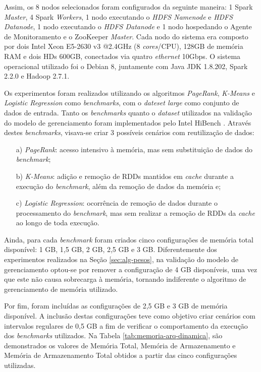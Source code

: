 Assim, os 8 nodos selecionados foram configurados da seguinte maneira: 1 Spark \textit{Master}, 4 Spark \textit{Workers}, 1 nodo executando o \textit{HDFS Namenode} e \textit{HDFS Datanode}, 1 nodo executando o \textit{HDFS Datanode} e 1 nodo hospedando o Agente de Monitoramento e o ZooKeeper \textit{Master}. Cada nodo do sistema era composto por dois  Intel Xeon E5-2630 v3 @2.4GHz (8 \textit{cores}/CPU), 128GB de memória RAM e dois HDs 600GB, conectados via quatro \textit{ethernet} 10Gbps. O sistema operacional utilizado foi o Debian 8, juntamente com Java JDK 1.8.202, Spark 2.2.0 e Hadoop 2.7.1.

Os experimentos foram realizados utilizando os algoritmos \textit{PageRank}, \textit{K-Means} e \textit{Logistic Regression} como \textit{benchmarks}, com o \textit{dateset large} como conjunto de dados de entrada. Tanto os \textit{benchmarks} quanto o \textit{dataset} utilizados na validação do modelo de gerenciamento foram implementados pelo Intel HiBench \cite{huang2010hibench}. Através destes \textit{benchmarks}, visava-se criar 3 possíveis cenários com reutilização de dados:

\begin{enumerate}
    \item[a)] \textit{PageRank}: acesso intensivo à memória, mas sem substituição de dados do \textit{benchmark};
    \item[b)] \textit{K-Means}: adição e remoção de RDDs mantidos em \textit{cache} durante a execução do \textit{benchmark}, além da remoção de dados da memória e; 
    \item[c)] \textit{Logistic Regression}: ocorrência de remoção de dados durante o processamento do \textit{benchmark}, mas sem realizar a remoção de RDDs da \textit{cache} ao longo de toda execução.
\end{enumerate}

Ainda, para cada \textit{benchmark} foram criados cinco configurações de memória total disponível: 1 GB, 1,5 GB, 2 GB, 2,5 GB e 3 GB. Diferentemente dos experimentos realizados na Seção \ref{sec:alg-pesos}, na validação do modelo de gerenciamento optou-se por remover a configuração de 4 GB disponíveis, uma vez que este não causa sobrecarga à memória, tornando indiferente o algoritmo de gerenciamento de memória utilizado. 

Por fim, foram incluídas as configurações de 2,5 GB e 3 GB de memória disponível. A inclusão destas configurações teve como objetivo criar cenários com intervalos regulares de 0,5 GB a fim de verificar o comportamento da execução dos \textit{benchmarks} utilizados. Na Tabela \ref{tab:memoria-arq-dinamica}, são demonstrados os valores de Memória Total, Memória de Armazenamento e Memória de Armazenamento Total obtidos a partir das cinco configurações utilizadas.

